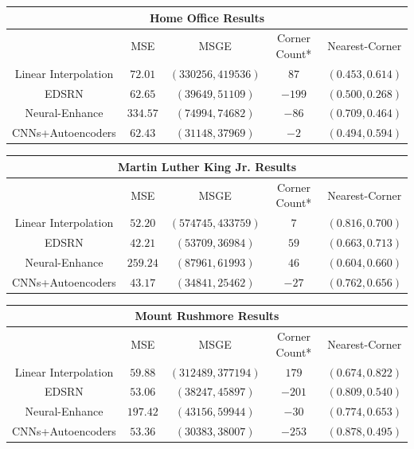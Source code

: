 \documentclass[letterpaper,12pt]{article}
\begin{document}
\begin{center}\begin{tabular}{ |c||c|c|c|c| }
    \hline
    \multicolumn{5}{|c|}{Home Office Results} \\
    \hline
    & MSE & MSGE\* & Corner Count* & Nearest-Corner\\
    \hline
    Linear Interpolation & $72.01$ & $(330256, 419536)$ & $87$ & $(0.453, 0.614)$\\
    EDSRN & $62.65$ & $(39649, 51109)$ & $-199$ & $(0.500, 0.268)$\\
    Neural-Enhance & $334.57$ & $(74994, 74682)$ & $-86$ & $(0.709, 0.464)$\\
    CNNs+Autoencoders & $62.43$ & $(31148, 37969)$ & $-2$ & $(0.494, 0.594)$\\
    \hline
\end{tabular}\end{center}

\begin{center}\begin{tabular}{ |c||c|c|c|c| }
    \hline
    \multicolumn{5}{|c|}{Martin Luther King Jr. Results} \\
    \hline
    & MSE & MSGE & Corner Count* & Nearest-Corner\\
    \hline
    Linear Interpolation & $52.20$ & $(574745, 433759)$ & $7$ & $(0.816, 0.700)$\\
    EDSRN & $42.21$ & $(53709, 36984)$ & $59$ & $(0.663, 0.713)$\\
    Neural-Enhance & $259.24$ & $(87961, 61993)$ & $46$ & $(0.604, 0.660)$\\
    CNNs+Autoencoders & $43.17$ & $(34841, 25462)$ & $-27$ & $(0.762, 0.656)$\\
    \hline
\end{tabular}\end{center}

\begin{center}\begin{tabular}{ |c||c|c|c|c| }
    \hline
    \multicolumn{5}{|c|}{Mount Rushmore Results} \\
    \hline
    & MSE & MSGE & Corner Count* & Nearest-Corner\\
    \hline
    Linear Interpolation & $59.88$ & $(312489, 377194)$ & $179$ & $(0.674, 0.822)$\\
    EDSRN & $53.06$ & $(38247, 45897)$ & $-201$ & $(0.809, 0.540)$\\
    Neural-Enhance & $197.42$ & $(43156, 59944)$ & $-30$ & $(0.774, 0.653)$\\
    CNNs+Autoencoders & $53.36$ & $(30383, 38007)$ & $-253$ & $(0.878, 0.495)$\\
    \hline
\end{tabular}\end{center}
\end{document}
